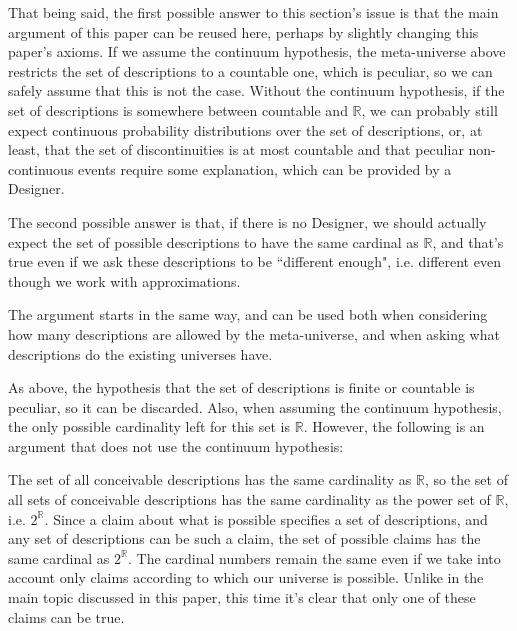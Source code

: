 \documentclass[a4paper
,draft
]{article}
\def\reale{\mathbb{R}}
\newcommand{\paper}[1]{paper}
\newcommand{\ghilimele}[1]{``#1"}
\begin{document}
That being said, the first possible answer to this section's issue
is that the main argument of this \paper{} can be reused here,
perhaps by slightly changing this \paper{}'s
axioms.
If we assume the continuum hypothesis, the meta-universe
above restricts the set of descriptions to a countable one, which is peculiar,
so we can safely assume that this is not the case.
Without the continuum hypothesis, if the set of descriptions is somewhere
between countable and $\reale$, we can probably still expect continuous
probability distributions over the set of descriptions, or, at least,
that the set of discontinuities is at most countable and that peculiar
non-continuous events require some explanation, which can be provided by
a Designer.

The second possible answer is that, if there is no Designer, we should actually
expect the set of
possible descriptions to have the same cardinal as $\reale$,
and that's true even
if we ask these descriptions to be \ghilimele{different enough},
i.e. different even though we work with approximations.

The argument starts in the same way, and can be used both when considering
how many descriptions are allowed by the meta-universe, and
when asking what descriptions do the existing universes have.

As above, the hypothesis that the set of descriptions is finite or countable
is peculiar, so it can be discarded.
Also, when assuming the continuum hypothesis, the only possible cardinality
left for this set is $\reale$.
However, the following is an argument that does not use the continuum
hypothesis:

The set of all conceivable descriptions has the same cardinality as $\reale$,
so the set of all sets of conceivable descriptions
has the same cardinality as the power set of $\reale$, i.e. $2^\reale$.
Since a claim about what is possible specifies a set of descriptions, and any
set of descriptions can be such a claim,
the set of possible claims has the same cardinal as $2^\reale$.
The cardinal numbers remain the same even if we take into account only claims
according to which our universe is possible.
Unlike in the main topic discussed in this
\paper{}, this time it's clear that only one of these claims can be true.

\end{document}

